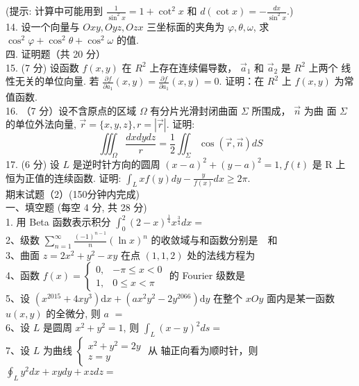 \documentclass[a4paper,11pt,UTF8]{article}
\begin{document}
(提示: 计算中可能用到 $\displaystyle \frac{1}{\sin ^2 x}=1+\cot ^2 x$ 和 $\displaystyle d(\cot x)=-\frac{d x}{\sin ^2 x}$.)\\
14. 设一个向量与 $O x y, O y z, O z x$ 三坐标面的夹角为 $\varphi, \theta, \omega$, 求 $\cos ^2 \varphi+\cos ^2 \theta+\cos ^2 \omega$ 的值.\\
四. 证明题（共 20 分）\\
15. (7 分) 设函数 $f(x, y)$ 在 $R^2$ 上存在连续偏导数， $\vec{a}_1$ 和 $\vec{a}_2$ 是 $R^2$ 上两个 线性无关的单位向量. 若 $\displaystyle \frac{\partial f}{\partial a_1}(x, y)=\frac{\partial f}{\partial a_1}(x, y)=0$. 证明：在 $R^2$ 上 $f(x, y)$ 为常值函数.\\
16. （7 分）设不含原点的区域 $\Omega$ 有分片光滑封闭曲面 $\Sigma$ 所围成， $\vec{n}$ 为曲 面 $\Sigma$ 的单位外法向量, $\vec{r}=\{x, y, z\}, r=|\vec{r}|$. 证明:
$$
\iiint_{\Omega} \frac{d x d y d z}{r}=\frac{1}{2} \iint_{\Sigma} \cos (\vec{r}, \vec{n}) d S
$$
17. (6 分) 设 $L$ 是逆时针方向的圆周 $(x-a)^2+(y-a)^2=1, f(t)$ 是 $\mathrm{R}$ 上 恒为正值的连续函数. 证明: $\displaystyle \int_L x f(y) d y-\frac{y}{f(x)} d x \geq 2 \pi$.\\
\newpage
期末试题（2）(150分钟内完成)\\
一、填空题 (每空 4 分, 共 28 分)\\
1. 用 Beta 函数表示积分 $\displaystyle \int_0^2(2-x)^{\frac{1}{4}} x^{\frac{3}{4}} d x=$\\
2、级数 $\displaystyle \sum_{n=1}^{\infty} \frac{(-1)^{n-1}}{n}(\ln x)^n$ 的收敛域与和函数分别是$\quad$和$\quad$\\
3、曲面 $z=2 x^2+y^2-x y$ 在点 $(1,1,2)$ 处的法线方程为\\
4、函数 $f(x)=\left\{\begin{array}{cc}0, & -\pi \leq x<0 \\ 1, & 0 \leq x<\pi\end{array}\right.$ 的 Fourier 级数是\\
5、设 $\left(x^{2015}+4 x y^3\right) \mathrm{d} x+\left(a x^2 y^2-2 y^{2066}\right) \mathrm{d} y$ 在整个 $x O y$ 面内是某一函数 $u(x, y)$ 的全微分, 则 $a$ $=$\\
6、设 $L$ 是圆周 $x^2+y^2=1$, 则 $\displaystyle \int_L(x-y)^2 d s=$\\
7、设 $L$ 为曲线 $\left\{\begin{array}{l}x^2+y^2=2 y \\ z=y\end{array}\right.$ 从 轴正向看为顺时针，则 $\displaystyle \oint_L y^2 d x+x y d y+x z d z=$\\
\end{document}
